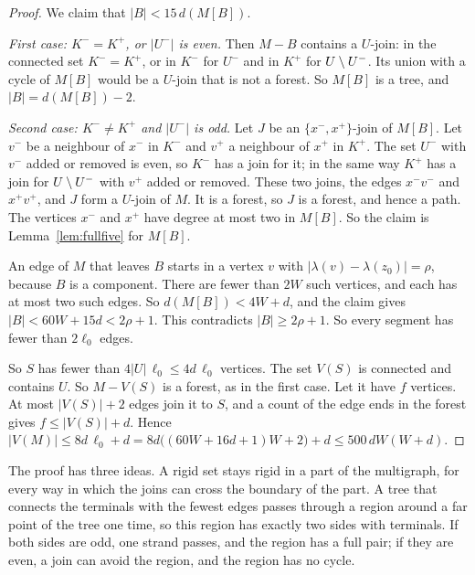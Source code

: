 \documentclass[11pt]{article}
\begin{document}
\begin{proof}
 We claim that $|B|<15\,d(M[B])$.

\emph{First case: $K^{-}=K^{+}$, or $|U^{-}|$ is even.} Then $M-B$ contains a $U$-join: in the
connected set $K^{-}=K^{+}$, or in $K^{-}$ for $U^{-}$ and in $K^{+}$ for $U\setminus U^{-}$. Its
union with a cycle of $M[B]$ would be a $U$-join that is not a forest. So $M[B]$ is a tree, and
$|B|=d(M[B])-2$.

\emph{Second case: $K^{-}\ne K^{+}$ and $|U^{-}|$ is odd.} Let $J$ be an $\{x^{-},x^{+}\}$-join
of $M[B]$. Let $v^{-}$ be a neighbour of $x^{-}$ in $K^{-}$ and $v^{+}$ a neighbour of $x^{+}$
in $K^{+}$. The set $U^{-}$ with $v^{-}$ added or removed is even, so $K^{-}$ has a join for it;
in the same way $K^{+}$ has a join for $U\setminus U^{-}$ with $v^{+}$ added or removed. These two
joins, the edges $x^{-}v^{-}$ and $x^{+}v^{+}$, and $J$ form a $U$-join of $M$. It is a forest,
so $J$ is a forest, and hence a path. The vertices $x^{-}$ and $x^{+}$ have degree at most two
in $M[B]$. So the claim is Lemma~\ref{lem:fullfive} for $M[B]$.

An edge of $M$ that leaves $B$ starts in a vertex $v$ with $|\lambda(v)-\lambda(z_0)|=\rho$,
because $B$ is a component. There are fewer than $2W$ such vertices, and each has at most two
such edges. So $d(M[B])<4W+d$, and the claim gives $|B|<60W+15d<2\rho+1$. This contradicts
$|B|\ge2\rho+1$. So every segment has fewer than $2\ell_0$ edges.

 So $S$ has fewer than $4|U|\,\ell_0\le4d\,\ell_0$ vertices. The set $V(S)$ is
connected and contains $U$. So $M-V(S)$ is a forest, as in the first case. Let it have $f$
vertices. At most $|V(S)|+2$ edges join it to $S$, and a count of the edge ends in the forest
gives $f\le|V(S)|+d$. Hence
$|V(M)|\le8d\,\ell_0+d=8d\bigl((60W+16d+1)W+2\bigr)+d\le500\,dW(W+d)$.
\end{proof}

\begin{fineprint}
The proof has three ideas. A rigid set stays rigid in a part of the multigraph, for every way in
which the joins can cross the boundary of the part. A tree that connects the terminals with the
fewest edges passes through a region around a far point of the tree one time, so this region
has exactly two sides with terminals. If both sides are odd, one strand passes, and the region
has a full pair; if they are even, a join can avoid the region, and the region has no cycle.
\end{fineprint}
\end{document}
